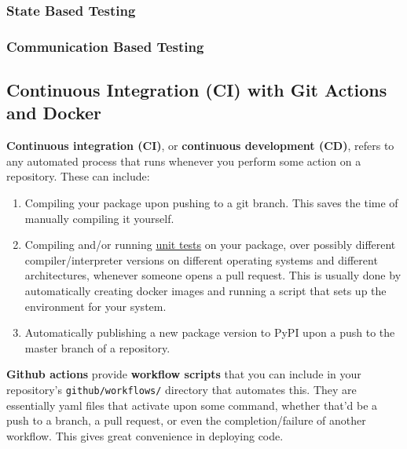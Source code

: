   \begin{definition}
    \label{def:output-based-functional-testing}
    
  \end{definition}

\subsubsection{State Based Testing}

  \begin{definition}
    \label{def:state-based-testing}
    
  \end{definition}

\subsubsection{Communication Based Testing}

  \begin{definition}
    \label{def:communication-based-testing}
    
  \end{definition}

\subsection{Continuous Integration (CI) with Git Actions and Docker} 

  \textbf{Continuous integration (CI)}, or \textbf{continuous development (CD)}, refers to any automated process that runs whenever you perform some action on a repository. These can include: 
  \begin{enumerate}
    \item Compiling your package upon pushing to a git branch. This saves the time of manually compiling it yourself. 
    \item Compiling and/or running \hyperref[def:unit-test]{unit tests} on your package, over possibly different compiler/interpreter versions on different operating systems and different architectures, whenever someone opens a pull request. This is usually done by automatically creating docker images and running a script that sets up the environment for your system. 
    \item Automatically publishing a new package version to PyPI upon a push to the master branch of a repository. 
  \end{enumerate} 

  \textbf{Github actions} provide \textbf{workflow scripts} that you can include in your repository's \texttt{github/workflows/} directory that automates this. They are essentially yaml files that activate upon some command, whether that'd be a push to a branch, a pull request, or even the completion/failure of another workflow. This gives great convenience in deploying code. 


